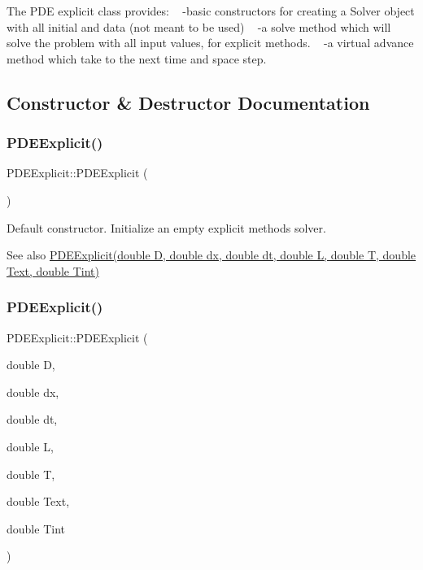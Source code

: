 The P\+DE explicit class provides\+: ~\newline
-\/basic constructors for creating a Solver object with all initial  and data (not meant to be used) ~\newline
-\/a solve method which will solve the problem with all input values,  for explicit methods. ~\newline
-\/a virtual advance method which take to the next time and space step. 

\subsection{Constructor \& Destructor Documentation}
\mbox{\label{class_p_d_e_explicit_a9adf9965c9e469d76b9d394128e4a5ea}} 
\subsubsection{\texorpdfstring{P\+D\+E\+Explicit()}{PDEExplicit()}\hspace{0.1cm}{\footnotesize\ttfamily [1/2]}}
{\footnotesize\ttfamily P\+D\+E\+Explicit\+::\+P\+D\+E\+Explicit (\begin{DoxyParamCaption}{ }\end{DoxyParamCaption})\hspace{0.3cm}{\ttfamily [inline]}}

Default constructor. Initialize an empty explicit methods solver. \begin{DoxySeeAlso}{See also}
\hyperlink{class_p_d_e_explicit_a8dd3f39d0a4d04a5b4ca0f8853f776f2}{P\+D\+E\+Explicit(double D, double dx, double dt, double L, double T, double Text, double Tint)} 
\end{DoxySeeAlso}
\mbox{\label{class_p_d_e_explicit_a8dd3f39d0a4d04a5b4ca0f8853f776f2}} 
\subsubsection{\texorpdfstring{P\+D\+E\+Explicit()}{PDEExplicit()}\hspace{0.1cm}{\footnotesize\ttfamily [2/2]}}
{\footnotesize\ttfamily P\+D\+E\+Explicit\+::\+P\+D\+E\+Explicit (\begin{DoxyParamCaption}\item[{double}]{D,  }\item[{double}]{dx,  }\item[{double}]{dt,  }\item[{double}]{L,  }\item[{double}]{T,  }\item[{double}]{Text,  }\item[{double}]{Tint }\end{DoxyParamCaption})\hspace{0.3cm}{\ttfamily [inline]}}

